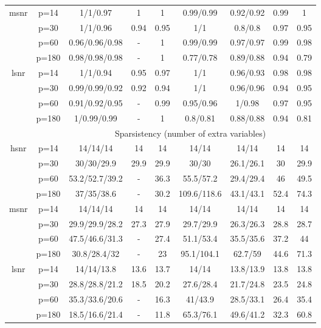 \begin{table}[ht]
{\begin{tabular}{|c|c|ccccccc|}
  \midrule\multirow{4}[2]{*}{msnr} & p=14 & 1/1/0.97 & 1 & 1 & 0.99/0.99 & 0.92/0.92 & 0.99 & 1 \\ 
   & p=30 & 1/1/0.96 & 0.94 & 0.95 & 1/1 & 0.8/0.8 & 0.97 & 0.95 \\ 
   & p=60 & 0.96/0.96/0.98 & - & 1 & 0.99/0.99 & 0.97/0.97 & 0.99 & 0.98 \\ 
   & p=180 & 0.98/0.98/0.98 & - & 1 & 0.77/0.78 & 0.89/0.88 & 0.94 & 0.79 \\ 
  \midrule\multirow{4}[2]{*}{lsnr} & p=14 & 1/1/0.94 & 0.95 & 0.97 & 1/1 & 0.96/0.93 & 0.98 & 0.98 \\ 
   & p=30 & 0.99/0.99/0.92 & 0.92 & 0.94 & 1/1 & 0.96/0.96 & 0.94 & 0.95 \\ 
   & p=60 & 0.91/0.92/0.95 & - & 0.99 & 0.95/0.96 & 1/0.98 & 0.97 & 0.95 \\ 
   & p=180 & 1/0.99/0.99 & - & 1 & 0.8/0.81 & 0.88/0.88 & 0.94 & 0.81 \\ 
   \midrule 
 \multicolumn{1}{|c}{} &       & \multicolumn{7}{c|}{Sparsistency (number of extra variables)} \\
\midrule\multirow{4}[2]{*}{hsnr} & p=14 & 14/14/14 & 14 & 14 & 14/14 & 14/14 & 14 & 14 \\ 
   & p=30 & 30/30/29.9 & 29.9 & 29.9 & 30/30 & 26.1/26.1 & 30 & 29.9 \\ 
   & p=60 & 53.2/52.7/39.2 & - & 36.3 & 55.5/57.2 & 29.4/29.4 & 46 & 49.5 \\ 
   & p=180 & 37/35/38.6 & - & 30.2 & 109.6/118.6 & 43.1/43.1 & 52.4 & 74.3 \\ 
  \midrule\multirow{4}[2]{*}{msnr} & p=14 & 14/14/14 & 14 & 14 & 14/14 & 14/14 & 14 & 14 \\ 
   & p=30 & 29.9/29.9/28.2 & 27.3 & 27.9 & 29.7/29.9 & 26.3/26.3 & 28.8 & 28.7 \\ 
   & p=60 & 47.5/46.6/31.3 & - & 27.4 & 51.1/53.4 & 35.5/35.6 & 37.2 & 44 \\ 
   & p=180 & 30.8/28.4/32 & - & 23 & 95.1/104.1 & 62.7/59 & 44.6 & 71.3 \\ 
  \midrule\multirow{4}[2]{*}{lsnr} & p=14 & 14/14/13.8 & 13.6 & 13.7 & 14/14 & 13.8/13.9 & 13.8 & 13.8 \\ 
   & p=30 & 28.8/28.8/21.2 & 18.5 & 20.2 & 27.6/28.4 & 21.7/24.8 & 23.5 & 24.8 \\ 
   & p=60 & 35.3/33.6/20.6 & - & 16.3 & 41/43.9 & 28.5/33.1 & 26.4 & 35.4 \\ 
   & p=180 & 18.5/16.6/21.4 & - & 11.8 & 65.3/76.1 & 49.6/41.2 & 32.3 & 60.8 \\ 
   \bottomrule 
\end{tabular}
}
\end{table}
